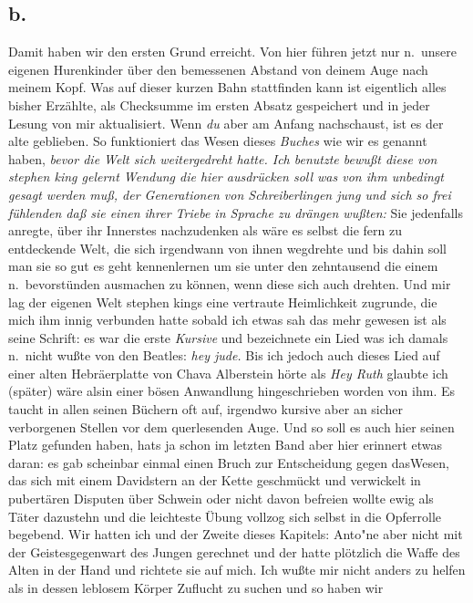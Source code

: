 \documentclass[
]{article}
\author{}
\date{\vspace{-2.5em}}
\begin{document}
\subsection{b.}\label{b.}

Damit haben wir den ersten Grund erreicht. Von hier führen jetzt nur
n.~unsere eigenen Hurenkinder über den bemessenen Abstand von deinem
Auge nach meinem Kopf. Was auf dieser kurzen Bahn stattfinden kann ist
eigentlich alles bisher Erzählte, als Checksumme im ersten Absatz
gespeichert und in jeder Lesung von mir aktualisiert. Wenn \emph{du}
aber am Anfang nachschaust, ist es der alte geblieben. So funktioniert
das Wesen dieses \emph{Buches} wie wir es genannt haben, \emph{bevor die
Welt sich weitergedreht hatte. Ich benutzte bewußt diese von stephen
king gelernt Wendung die hier ausdrücken soll was von ihm unbedingt
gesagt werden muß, der Generationen von Schreiberlingen jung und sich so
frei fühlenden daß sie einen ihrer Triebe in Sprache zu drängen wußten:
}Sie jedenfalls anregte, über ihr Innerstes nachzudenken als wäre es
selbst die fern zu entdeckende Welt, die sich irgendwann von ihnen
wegdrehte und bis dahin soll man sie so gut es geht kennenlernen um sie
unter den zehntausend die einem n.~bevorstünden ausmachen zu können,
wenn diese sich auch drehten. Und mir lag der eigenen Welt stephen kings
eine vertraute Heimlichkeit zugrunde, die mich ihm innig verbunden hatte
sobald ich etwas sah das mehr gewesen ist als seine Schrift: es war die
erste \emph{Kursive} und bezeichnete ein Lied was ich damals n.~nicht
wußte von den Beatles: \emph{hey jude. }Bis ich jedoch auch dieses Lied
auf einer alten Hebräerplatte von Chava Alberstein hörte als \emph{Hey
Ruth} glaubte ich (später) wäre alsin einer bösen Anwandlung
hingeschrieben worden von ihm. Es taucht in allen seinen Büchern oft
auf, irgendwo kursive aber an sicher verborgenen Stellen vor dem
querlesenden Auge. Und so soll es auch hier seinen Platz gefunden haben,
hat\textquotesingle s ja schon im letzten Band aber hier erinnert etwas
daran: es gab scheinbar einmal einen Bruch zur Entscheidung gegen
dasWesen, das sich mit einem Davidstern an der Kette geschmückt und
verwickelt in pubertären Disputen über Schwein oder nicht davon befreien
wollte ewig als Täter dazustehn und die leichteste Übung vollzog sich
selbst in die Opferrolle begebend. Wir hatten ich und der Zweite dieses
Kapitels: Anto"ne aber nicht mit der Geistesgegenwart des Jungen
gerechnet und der hatte plötzlich die Waffe des Alten in der Hand und
richtete sie auf mich. Ich wußte mir nicht anders zu helfen als in
dessen leblosem Körper Zuflucht zu suchen und so haben wir
\end{document}
